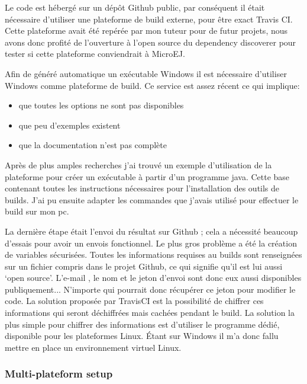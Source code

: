\documentclass[french,a4paper,12pt]{report}
\begin{document}
Le code est hébergé sur un dépôt Github public, par conséquent il était nécessaire d’utiliser une plateforme de build externe, pour être exact Travis CI. Cette plateforme avait été repérée par mon tuteur pour de futur projets, nous avons donc profité de l'ouverture à l'open source du dependency discoverer pour tester si cette plateforme conviendrait à MicroEJ.

Afin de généré automatique un exécutable Windows il est nécessaire d’utiliser Windows comme plateforme de build. Ce service est assez récent ce qui implique:

\begin{itemize}

 \item que toutes les options ne sont pas disponibles
 \item que peu d’exemples existent
 \item que la documentation n’est pas complète

\end{itemize}

Après de plus amples recherches j’ai trouvé un exemple d’utilisation de la plateforme pour créer un exécutable à partir d’un programme java. Cette base contenant toutes les instructions nécessaires pour l’installation des outils de builds. J’ai pu ensuite adapter les commandes que j’avais utilisé pour effectuer le build sur mon pc. 

La dernière étape était l’envoi du résultat sur Github ; cela a nécessité beaucoup d'essais pour avoir un envois fonctionnel. Le plus gros problème a été la création de variables sécurisées. Toutes les informations requises au builds sont renseignées sur un fichier compris dans le projet Github, ce qui signifie qu’il est lui aussi ‘open source’. L’e-mail , le nom et le jeton d’envoi sont donc eux aussi disponibles publiquement... N’importe qui pourrait donc récupérer ce jeton pour modifier le code. La solution proposée par TravisCI est la possibilité de chiffrer ces informations qui seront déchiffrées mais cachées pendant le build. La solution la plus simple pour chiffrer des informations est d’utiliser le programme dédié, disponible pour les plateformes Linux. Étant sur Windows il m’a donc fallu mettre en place un environnement virtuel Linux.

\subsubsection{Multi-plateform setup}
\end{document}
